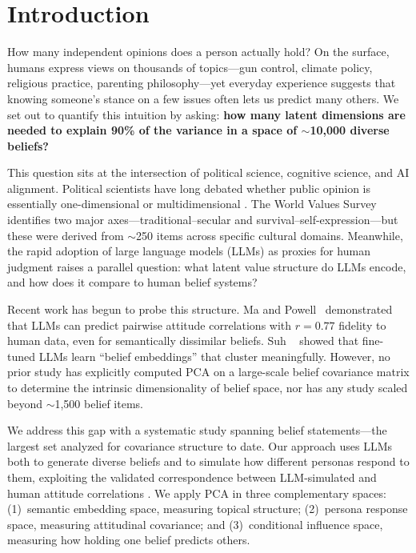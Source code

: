 \section{Introduction}
\label{sec:intro}

How many independent opinions does a person actually hold? On the surface, humans express views on thousands of topics---gun control, climate policy, religious practice, parenting philosophy---yet everyday experience suggests that knowing someone's stance on a few issues often lets us predict many others. We set out to quantify this intuition by asking: {\bf how many latent dimensions are needed to explain 90\% of the variance in a space of $\sim$10,000 diverse beliefs?}

This question sits at the intersection of political science, cognitive science, and AI alignment. Political scientists have long debated whether public opinion is essentially one-dimensional \cite{converse1964nature} or multidimensional \cite{inglehart2005modernization}. The World Values Survey identifies two major axes---traditional--secular and survival--self-expression---but these were derived from $\sim$250 items across specific cultural domains. Meanwhile, the rapid adoption of large language models (LLMs) as proxies for human judgment \cite{santurkar2023whose, argyle2023out} raises a parallel question: what latent value structure do LLMs encode, and how does it compare to human belief systems?

Recent work has begun to probe this structure. Ma and Powell~\cite{ma2025llm} demonstrated that LLMs can predict pairwise attitude correlations with $r = 0.77$ fidelity to human data, even for semantically dissimilar beliefs. Suh \etal~\cite{suh2025language} showed that fine-tuned LLMs learn ``belief embeddings'' that cluster meaningfully. However, no prior study has explicitly computed PCA on a large-scale belief covariance matrix to determine the intrinsic dimensionality of belief space, nor has any study scaled beyond $\sim$1,500 belief items.

We address this gap with a systematic study spanning \nbeliefs belief statements---the largest set analyzed for covariance structure to date. Our approach uses LLMs both to generate diverse beliefs and to simulate how different personas respond to them, exploiting the validated correspondence between LLM-simulated and human attitude correlations \cite{ma2025llm}. We apply PCA in three complementary spaces: (1)~semantic embedding space, measuring topical structure; (2)~persona response space, measuring attitudinal covariance; and (3)~conditional influence space, measuring how holding one belief predicts others.

